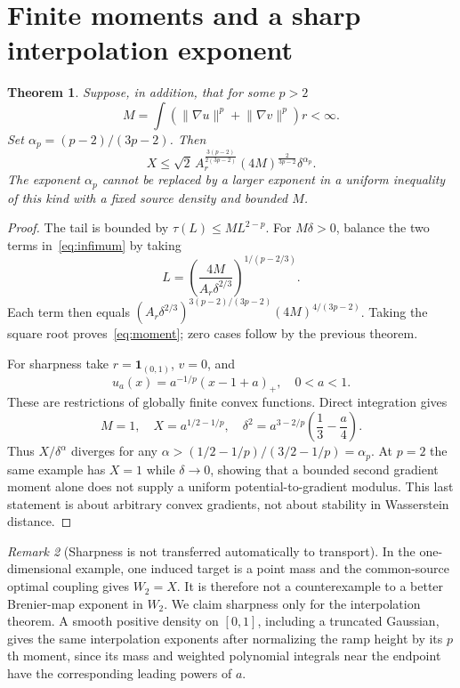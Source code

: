 \documentclass[11pt]{article}
\newtheorem{theorem}{Theorem}[section]
\theoremstyle{remark}\newtheorem{remark}[theorem]{Remark}
\newcommand{\norm}[1]{\lVert#1\rVert}\newcommand{\ind}{\mathbf 1}
\begin{document}
\section{Finite moments and a sharp interpolation exponent}
\begin{theorem}\label{thm:moment}
Suppose, in addition, that for some $p>2$
\[
 M=\int(\norm{\nabla u}^p+\norm{\nabla v}^p)r<\infty.
\]
Set $\alpha_p=(p-2)/(3p-2)$. Then
\begin{equation}\label{eq:moment}
 X\le\sqrt2\,A_r^{\frac{3(p-2)}{2(3p-2)}}
                 (4M)^{\frac2{3p-2}}\delta^{\alpha_p}.
\end{equation}
The exponent $\alpha_p$ cannot be replaced by a larger exponent in a uniform inequality of this kind with a fixed source density and bounded $M$.
\end{theorem}
\begin{proof}
The tail is bounded by $\tau(L)\le ML^{2-p}$. For $M\delta>0$, balance the two terms in~\eqref{eq:infimum} by taking
\[
 L=\left(\frac{4M}{A_r\delta^{2/3}}\right)^{1/(p-2/3)}.
\]
Each term then equals
$(A_r\delta^{2/3})^{3(p-2)/(3p-2)}(4M)^{4/(3p-2)}$.
Taking the square root proves~\eqref{eq:moment}; zero cases follow by the previous theorem.

For sharpness take $r=\ind_{(0,1)}$, $v=0$, and
\[
 u_a(x)=a^{-1/p}(x-1+a)_+,\quad0<a<1.
\]
These are restrictions of globally finite convex functions. Direct integration gives
\[
 M=1,\quad X=a^{1/2-1/p},\quad
 \delta^2=a^{3-2/p}\left(\frac13-\frac a4\right).
\]
Thus $X/\delta^\alpha$ diverges for any
$\alpha>(1/2-1/p)/(3/2-1/p)=\alpha_p$. At $p=2$ the same example has $X=1$ while $\delta\to0$, showing that a bounded second gradient moment alone does not supply a uniform potential-to-gradient modulus. This last statement is about arbitrary convex gradients, not about stability in Wasserstein distance.
\end{proof}

\begin{remark}[Sharpness is not transferred automatically to transport]
In the one-dimensional example, one induced target is a point mass and the common-source optimal coupling gives $W_2=X$. It is therefore not a counterexample to a better Brenier-map exponent in $W_2$. We claim sharpness only for the interpolation theorem. A smooth positive density on $[0,1]$, including a truncated Gaussian, gives the same interpolation exponents after normalizing the ramp height by its $p$th moment, since its mass and weighted polynomial integrals near the endpoint have the corresponding leading powers of $a$.
\end{remark}
\end{document}
